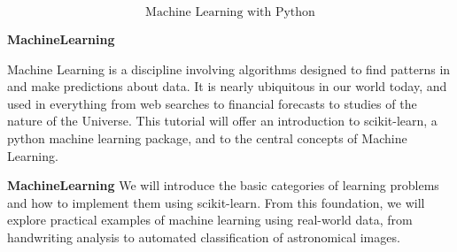 \documentclass[MASTER.tex]{subfiles}
\begin{document}
 
	
	
	\begin{frame}
		\huge
		\[ \mbox{Machine Learning with Python} \]
	\end{frame}
	
\begin{frame}
\Large
\textbf{MachineLearning}

Machine Learning is a discipline involving algorithms designed to find patterns in and make predictions about data. It is nearly ubiquitous in our world today, and used in everything from web searches to financial forecasts to studies of the nature of the Universe. This tutorial will offer an introduction to scikit-learn, a python machine learning package, and to the central concepts of Machine Learning. 

\end{frame}
\begin{frame}
\Large	\textbf{MachineLearning}
	We will introduce the basic categories of learning problems and how to implement them using scikit-learn. From this foundation, we will explore practical examples of machine learning using real-world data, from handwriting analysis to automated classification of astronomical images.

\end{frame}
\end{document}

